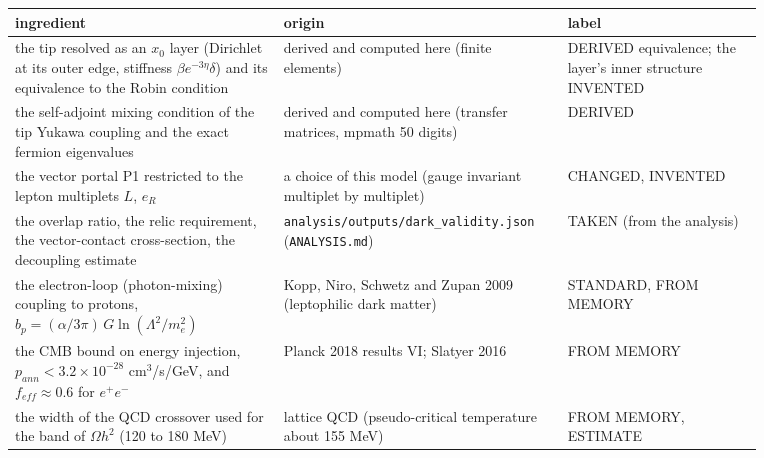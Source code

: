 \documentclass[11pt]{article}
\begin{document}
\begin{longtable}{>{\raggedright\arraybackslash}p{0.332\linewidth}>{\raggedright\arraybackslash}p{0.297\linewidth}>{\raggedright\arraybackslash}p{0.240\linewidth}}
\toprule
\textbf{ingredient} & \textbf{origin} & \textbf{label} \\
\midrule
the tip resolved as an $x_0$ layer (Dirichlet at its outer edge, stiffness $\beta e^{-3\eta}\delta$) and its equivalence to the Robin condition & derived and computed here (finite elements) & DERIVED equivalence; the layer's inner structure INVENTED \\
the self-adjoint mixing condition of the tip Yukawa coupling and the exact fermion eigenvalues & derived and computed here (transfer matrices, mpmath 50 digits) & DERIVED \\
the vector portal P1 restricted to the lepton multiplets $L$, $e_R$ & a choice of this model (gauge invariant multiplet by multiplet) & CHANGED, INVENTED \\
the overlap ratio, the relic requirement, the vector-contact cross-section, the decoupling estimate & \texttt{analysis/\allowbreak{}outputs/\allowbreak{}dark\_\allowbreak{}validity.\allowbreak{}json} (\texttt{ANALYSIS.\allowbreak{}md}) & TAKEN (from the analysis) \\
the electron-loop (photon-mixing) coupling to protons, $b_p = (\alpha/3\pi)\,G\ln(\Lambda^2/m_e^2)$ & Kopp, Niro, Schwetz and Zupan 2009 (leptophilic dark matter) & STANDARD, FROM MEMORY \\
the CMB bound on energy injection, $p_{ann} < 3.2\times10^{-28}$ cm$^3$/s/GeV, and $f_{eff} \approx 0.6$ for $e^+e^-$ & Planck 2018 results VI; Slatyer 2016 & FROM MEMORY \\
the width of the QCD crossover used for the band of $\Omega h^2$ (120 to 180 MeV) & lattice QCD (pseudo-critical temperature about 155 MeV) & FROM MEMORY, ESTIMATE \\
\bottomrule
\end{longtable}
\end{document}
